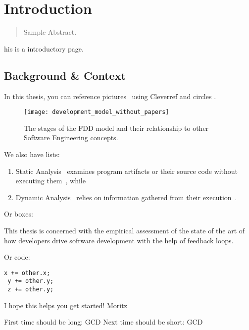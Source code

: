 \chapter{Introduction}
\label{introduction}

\begin{abstract}
Sample Abstract.
\end{abstract}



\newpage

his is a introductory page.

\section{Background \& Context}
In this thesis, you can reference pictures~ using Cleverref and circles .

\begin{figure}[htb]
	\centering
	\texttt{[image: development\_model\_without\_papers]}
	\caption{The stages of the FDD model and their relationship to other
          Software Engineering concepts.}
	\label{fig:devmodel}
\end{figure}

We also have lists:

\begin{enumerate}
  \item Static Analysis~ examines program artifacts or
    their source code without executing them~\cite{wichmann1995industrial}, while
 \item Dynamic Analysis~ relies on information gathered from their
   execution~\cite{cornelissen2009systematic}.
\end{enumerate}

Or boxes:

\begin{framed}
This thesis is concerned with the empirical assessment of the state of the art of how developers
drive software development with the help of feedback loops.
\end{framed}

Or code:
\begin{lstlisting}[caption={\textsc{TrinityCore}},label={lst:e1}]
 x += other.x;
 y += other.y;
 z += other.y;
\end{lstlisting}


I hope this helps you get started!
Moritz

First time should be long: \gls{GCD}
Next time should be short: \gls{GCD}

